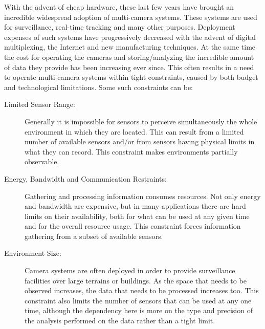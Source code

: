 
With the advent of cheap hardware, these last few years have brought an incredible widespread
adoption of multi-camera systems. These systems are used for surveillance, real-time tracking and
many other purposes. Deployment expenses of such systems have progressively decreased with the
advent of digital multiplexing, the Internet and new manufacturing techniques. At the same time the
cost for operating the cameras and storing/analyzing the incredible amount of data they provide has
been increasing ever since. This often results in a need to operate multi-camera systems within
tight constraints, caused by both budget and technological limitations. Some such constraints can
be:


\begin{description}

\item[Limited Sensor Range:] Generally it is impossible for sensors to perceive simultaneously the
    whole environment in which they are located. This can result from a limited number of available
    sensors and/or from sensors having physical limits in what they can record. This constraint
    makes environments partially observable.

\item[Energy, Bandwidth and Communication Restraints:] Gathering and processing information consumes
    resources. Not only energy and bandwidth are expensive, but in many applications there are hard
    limits on their availability, both for what can be used at any given time and for the overall
    resource usage. This constraint forces information gathering from a subset of available sensors.

\item[Environment Size:] Camera systems are often deployed in order to provide surveillance
    facilities over large terrains or buildings. As the space that needs to be observed increases, the
    data that needs to be processed increases too. This constraint also limits the number of sensors
    that can be used at any one time, although the dependency here is more on the type and precision
    of the analysis performed on the data rather than a tight limit.

\end{description}

